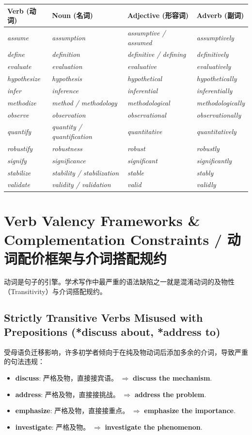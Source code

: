 \begingroup
\ReportTableStyle
\begin{tabularx}{\linewidth}{p{3.0cm}p{3.6cm}p{3.6cm}X}
\toprule
\textbf{\color{AcadNavy}Verb (动词)} & \textbf{\color{AcadNavy}Noun (名词)} & \textbf{\color{AcadNavy}Adjective (形容词)} & \textbf{\color{AcadNavy}Adverb (副词)} \tabularnewline
\midrule
\textit{assume} & \textit{assumption} & \textit{assumptive / assumed} & \textit{assumptively} \tabularnewline
\textit{define} & \textit{definition} & \textit{definitive / defining} & \textit{definitively} \tabularnewline
\textit{evaluate} & \textit{evaluation} & \textit{evaluative} & \textit{evaluatively} \tabularnewline
\textit{hypothesize} & \textit{hypothesis} & \textit{hypothetical} & \textit{hypothetically} \tabularnewline
\textit{infer} & \textit{inference} & \textit{inferential} & \textit{inferentially} \tabularnewline
\textit{methodize} & \textit{method / methodology} & \textit{methodological} & \textit{methodologically} \tabularnewline
\textit{observe} & \textit{observation} & \textit{observational} & \textit{observationally} \tabularnewline
\textit{quantify} & \textit{quantity / quantification} & \textit{quantitative} & \textit{quantitatively} \tabularnewline
\textit{robustify} & \textit{robustness} & \textit{robust} & \textit{robustly} \tabularnewline
\textit{signify} & \textit{significance} & \textit{significant} & \textit{significantly} \tabularnewline
\textit{stabilize} & \textit{stability / stabilization} & \textit{stable} & \textit{stably} \tabularnewline
\textit{validate} & \textit{validity / validation} & \textit{valid} & \textit{validly} \tabularnewline
\bottomrule
\end{tabularx}
\endgroup

\section{Verb Valency Frameworks \& Complementation Constraints / 动词配价框架与介词搭配规约}
动词是句子的引擎。学术写作中最严重的语法缺陷之一就是混淆动词的及物性（Transitivity）与介词搭配规约。

\subsection{Strictly Transitive Verbs Misused with Prepositions (*discuss about, *address to)}
受母语负迁移影响，许多初学者倾向于在纯及物动词后添加多余的介词，导致严重的句法违规：
\begin{itemize}[leftmargin=1.5em]
  \item \textbf{discuss}: 严格及物，直接接宾语。 $\Longrightarrow$ \textbf{discuss the mechanism}.
  \item \textbf{address}: 严格及物，直接接挑战。 $\Longrightarrow$ \textbf{address the problem}.
  \item \textbf{emphasize}: 严格及物，直接接重点。 $\Longrightarrow$ \textbf{emphasize the importance}.
  \item \textbf{investigate}: 严格及物。 $\Longrightarrow$ \textbf{investigate the phenomenon}.
\end{itemize}

